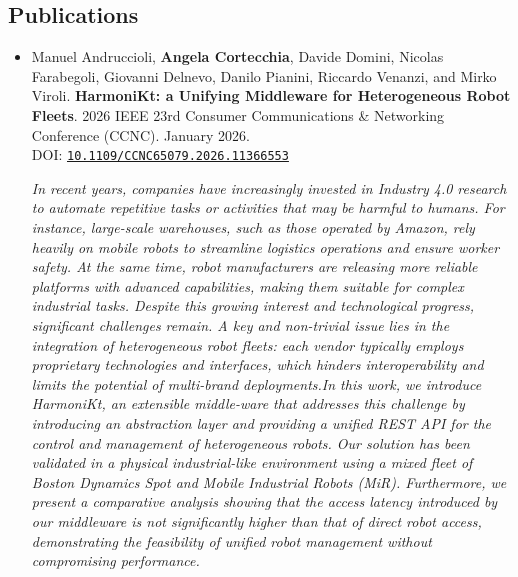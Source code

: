 \documentclass[11pt]{scrartcl}
\newcommand{\pubentry}[6]{%
  \item
  #1.
  \textbf{#2}.
  #3.
  #4.
  \if\relax\detokenize{#6}\relax\else
    \\ DOI: \href{https://doi.org/#6}{\texttt{#6}}%
  \fi

  \begin{sloppypar}
    \vspace{8pt}
    \textit{#5}
    \vspace{8pt}
  \end{sloppypar}
}
\newenvironment{publications}
  {%
    \subsection*{Publications}
    \begin{itemize}
  }
  {%
    \end{itemize}
  }
\begin{document}
\begin{publications}
  \pubentry
  {Manuel Andruccioli, \textbf{Angela Cortecchia}, Davide Domini, Nicolas Farabegoli, Giovanni Delnevo, Danilo Pianini, Riccardo Venanzi, and Mirko Viroli}
  {HarmoniKt: a Unifying Middleware for Heterogeneous Robot Fleets}
  {2026 IEEE 23rd Consumer Communications \& Networking Conference (CCNC)}
  {January 2026}
  {In recent years, companies have increasingly invested in Industry 4.0 research to automate repetitive tasks or activities that may be harmful to humans. For instance, large-scale warehouses, such as those operated by Amazon, rely heavily on mobile robots to streamline logistics operations and ensure worker safety. At the same time, robot manufacturers are releasing more reliable platforms with advanced capabilities, making them suitable for complex industrial tasks. Despite this growing interest and technological progress, significant challenges remain. A key and non-trivial issue lies in the integration of heterogeneous robot fleets: each vendor typically employs proprietary technologies and interfaces, which hinders interoperability and limits the potential of multi-brand deployments.In this work, we introduce HarmoniKt, an extensible middle-ware that addresses this challenge by introducing an abstraction layer and providing a unified REST API for the control and management of heterogeneous robots. Our solution has been validated in a physical industrial-like environment using a mixed fleet of Boston Dynamics Spot and Mobile Industrial Robots (MiR). Furthermore, we present a comparative analysis showing that the access latency introduced by our middleware is not significantly higher than that of direct robot access, demonstrating the feasibility of unified robot management without compromising performance.}
  {10.1109/CCNC65079.2026.11366553}


\end{publications}
\end{document}
